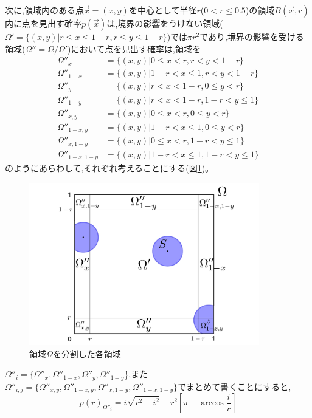次に,領域内のある点$\vec x=(x,y)$を中心として半径$r$($0 < r \le 0.5$)の領域$B(\vec x, r)$内に点を見出す確率$p(\vec x)$は,境界の影響をうけない領域($\Omega ' = \{(x,y) | r \le x \le 1-r, r \le y \le 1-r \}$)では$\pi r^{2}$であり,境界の影響を受ける領域($\Omega'' = \Omega / \Omega'$)において点を見出す確率は,領域を
\begin{align}
\Omega''_{x} &= \{(x,y) | 0 \le x < r, r< y < 1-r\}\nonumber \\
\Omega''_{1-x} &= \{(x,y) | 1-r < x \le 1, r< y < 1-r\}\nonumber \\
\Omega''_{y} &= \{(x,y) | r < x < 1-r, 0 \le y < r\}\nonumber \\
\Omega''_{1-y} &= \{(x,y) | r < x < 1-r, 1-r < y \le 1\}\nonumber \\
\Omega''_{x,y} &= \{(x,y) | 0 \le x < r, 0 \le y < r\}\nonumber \\
\Omega''_{1-x,y} &= \{(x,y) | 1-r < x \le 1, 0 \le y < r\}\nonumber \\
\Omega''_{x,1-y} &= \{(x,y) | 0 \le x < r, 1-r < y \le 1\}\nonumber \\
\Omega''_{1-x, 1-y} &= \{(x,y) | 1-r < x \le 1, 1-r < y \le 1\}\nonumber
\end{align}
のようにあらわして,それぞれ考えることにする(図\ref{fig:f20})。
\begin{figure}[H]
    \begin{center}
        \includegraphics[width=10cm]{../img/omega.jpg}
        \caption{領域$\Omega$を分割した各領域}
        \label{fig:f20}
    \end{center}
\end{figure}
$\Omega''_{i} = \{\Omega''_{x}, \Omega''_{1-x}, \Omega''_{y}, \Omega''_{1-y}$\},また$\Omega''_{i,j} = \{\Omega''_{x,y}, \Omega''_{1-x,y}, \Omega''_{x,1-y}, \Omega''_{1-x,1-y}\}$でまとめて書くことにすると,
\[p(r)_{\Omega''_{i}} = i \sqrt{r^{2}-i^{2}} + r^{2} \left[ \pi -\arccos \frac{i}{r} \right]\]
